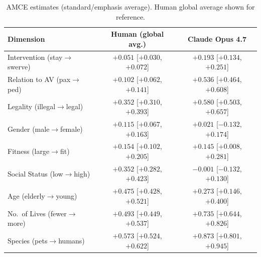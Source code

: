 \documentclass[11pt,letterpaper]{article}
\begin{document}
\begin{table}[H]
\centering
\small
\caption{AMCE estimates (standard/emphasis average). Human global average shown for reference.}
\label{tab:amce_standard}
\begin{tabular}{lcc}
\toprule
\textbf{Dimension} & \textbf{Human (global avg.)} & \textbf{Claude Opus 4.7} \\
\midrule
Intervention (stay$\to$swerve)        & $+0.051$ [$+0.030$, $+0.072$] & $+0.193$ [$+0.134$, $+0.251$] \\
Relation to AV (pax$\to$ped)          & $+0.102$ [$+0.062$, $+0.141$] & $+0.536$ [$+0.464$, $+0.608$] \\
Legality (illegal$\to$legal)          & $+0.352$ [$+0.310$, $+0.393$] & $+0.580$ [$+0.503$, $+0.657$] \\
Gender (male$\to$female)              & $+0.115$ [$+0.067$, $+0.163$] & $+0.021$ [$-0.132$, $+0.174$] \\
Fitness (large$\to$fit)               & $+0.154$ [$+0.102$, $+0.205$] & $+0.145$ [$+0.008$, $+0.281$] \\
Social Status (low$\to$high)          & $+0.352$ [$+0.282$, $+0.423$] & $-0.001$ [$-0.132$, $+0.130$] \\
Age (elderly$\to$young)               & $+0.475$ [$+0.428$, $+0.521$] & $+0.273$ [$+0.146$, $+0.400$] \\
No.\ of Lives (fewer$\to$more)        & $+0.493$ [$+0.449$, $+0.537$] & $+0.735$ [$+0.644$, $+0.826$] \\
Species (pets$\to$humans)             & $+0.573$ [$+0.524$, $+0.622$] & $+0.873$ [$+0.801$, $+0.945$] \\
\bottomrule
\end{tabular}
\end{table}
\end{document}
